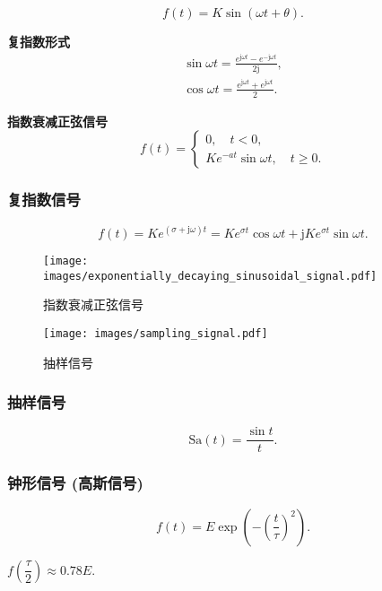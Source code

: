 \rmg
\begin{equation}
    f(t)=K\sin(\omega t+\theta).
\end{equation}

\textbf{复指数形式}
\begin{equation}
    \begin{gathered}
        \sin\omega t=\frac{e^{\mathrm{j}\omega t}-e^{-\mathrm{j}\omega t}}{2\mathrm{j}}, \\
        \cos\omega t=\frac{e^{\mathrm{j}\omega t}+e^{\mathrm{j}\omega t}}{2}.
    \end{gathered}
\end{equation}

\textbf{指数衰减正弦信号}
\begin{equation}
    f(t)=\begin{cases}
        0,\quad t<0, \\
        Ke^{-at}\sin\omega t,\quad t\geq 0.
    \end{cases}
\end{equation}

\subsubsection{复指数信号}

\rmg
\begin{equation}
    f(t)=Ke^{(\sigma+\mathrm{j}\omega)t}=Ke^{\sigma t}\cos\omega t+\mathrm{j}Ke^{\sigma t}\sin\omega t.
\end{equation}

\begin{figure}[ht]
    \centering
    \begin{minipage}{.48\textwidth}
        \centering
        \texttt{[image: images/exponentially\_decaying\_sinusoidal\_signal.pdf]}
        \caption{指数衰减正弦信号}
    \end{minipage}
    \begin{minipage}{.48\textwidth}
        \centering
        \texttt{[image: images/sampling\_signal.pdf]}
        \caption{抽样信号}
    \end{minipage}
\end{figure}

\subsubsection{抽样信号}

\rmg
\begin{equation}
    \mathrm{Sa}(t)=\frac{\sin t}{t}.
\end{equation}

\subsubsection{钟形信号 (高斯信号)}

\rmg
\begin{equation}
    f(t)=E\exp\left(-\left(\frac{t}{\tau}\right)^2\right).
\end{equation}

$f\left(\dfrac{\tau}{2}\right)\approx 0.78E$.
